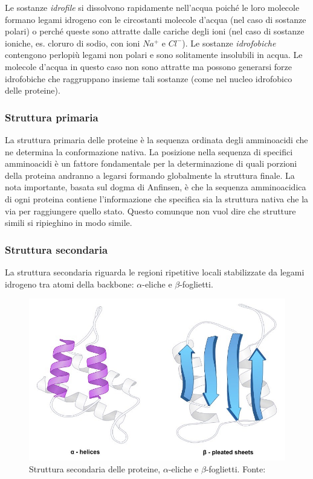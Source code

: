 {{\begin{itemize}
	Le sostanze \textit{idrofile} si dissolvono rapidamente nell'acqua poiché le loro molecole formano legami idrogeno con le circostanti molecole d'acqua (nel caso di sostanze polari) o perché queste sono attratte dalle cariche degli ioni (nel caso di sostanze ioniche, es. cloruro di sodio, con ioni $Na^{+}$ e $Cl^{-}$). Le sostanze \textit{idrofobiche} contengono perlopiù legami non polari e sono solitamente insolubili in acqua. Le molecole d'acqua in questo caso non sono attratte ma possono generarsi forze idrofobiche che raggruppano insieme tali sostanze (come nel nucleo idrofobico delle proteine).
\end{itemize}
}


\subsubsection{Struttura primaria}
La struttura primaria delle proteine è la sequenza ordinata degli amminoacidi che ne determina la conformazione nativa. La posizione nella sequenza di specifici amminoacidi è un fattore fondamentale per la determinazione di quali porzioni della proteina andranno a legarsi formando globalmente la struttura finale. La nota importante, basata sul dogma di Anfinsen, è che la sequenza amminoacidica di ogni proteina contiene l'informazione che specifica sia la struttura nativa che la via per raggiungere quello stato. Questo comunque non vuol dire che strutture simili si ripieghino in modo simile.
	
\subsubsection{Struttura secondaria}
La struttura secondaria riguarda le regioni ripetitive locali stabilizzate da legami idrogeno tra atomi della backbone: $\alpha$-eliche e $\beta$-foglietti.

\begin{figure}[h]
	\centering
	\includegraphics[scale=0.4]{images/secondary.jpeg}
	\caption{Struttura secondaria delle proteine, $\alpha$-eliche e $\beta$-foglietti. Fonte: \cite{proteinStrucBioNinja}}
	\label{fig:struttura-secondaria}
\end{figure}

}
